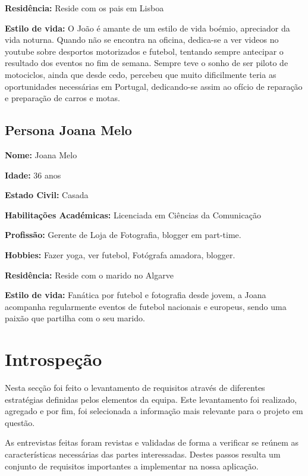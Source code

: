 \textbf{Residência: }Reside com os pais em Lisboa\vspace{5mm}

\textbf{Estilo de vida: } O João é amante de um estilo de vida boémio, apreciador da vida noturna. Quando não se encontra na oficina, dedica-se a ver videos no youtube sobre desportos motorizados e futebol, tentando sempre antecipar o resultado dos eventos no fim de semana. Sempre teve o sonho de ser piloto de motociclos, ainda que desde cedo, percebeu que muito dificilmente teria as oportunidades necessárias em Portugal, dedicando-se assim ao ofício de reparação e preparação de carros e motas.

\subsection{Persona Joana Melo} 

\textbf{Nome: } Joana Melo

\textbf{Idade: }36 anos

\textbf{Estado Civil: } Casada

\textbf{Habilitações Académicas: } Licenciada em Ciências da Comunicação

\textbf{Profissão: } Gerente de Loja de Fotografia, blogger em part-time.

\textbf{Hobbies: } Fazer yoga, ver futebol, Fotógrafa amadora, blogger.

\textbf{Residência: }Reside com o marido no Algarve\vspace{5mm}

\textbf{Estilo de vida: } Fanática por futebol e fotografia desde jovem, a Joana acompanha regularmente eventos de futebol nacionais e europeus, sendo uma paixão que partilha com o seu marido. 

\section{Introspeção}
Nesta secção foi feito o levantamento de requisitos através de diferentes estratégias definidas pelos elementos da equipa. Este levantamento foi realizado, agregado e por fim, foi selecionada a informação mais relevante para o projeto em questão.
\par
As entrevistas feitas foram revistas e validadas de forma a verificar se reúnem as características necessárias das partes interessadas. Destes passos resulta um conjunto de requisitos importantes a implementar na nossa aplicação.